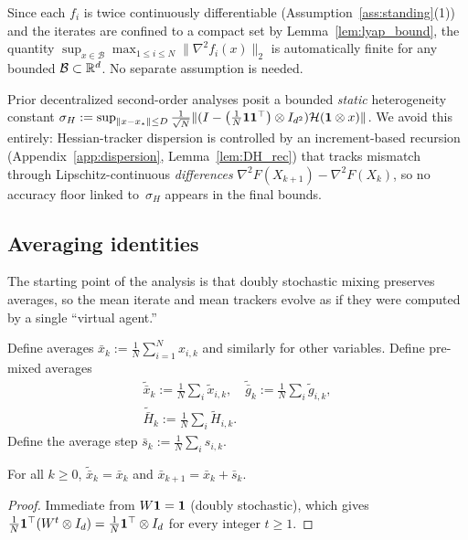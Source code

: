 \documentclass[review,onefignum,onetabnum]{siamart171218}
\begin{document}
	\begin{remark}
		Since each $f_i$ is twice continuously differentiable (Assumption~\ref{ass:standing}(1))
		and the iterates are confined to a compact set by Lemma~\ref{lem:lyap_bound},
		the quantity $\sup_{x\in\mathcal B}\max_{1\le i\le N}\|\nabla^2 f_i(x)\|_2$
		is automatically finite for any bounded $\mathcal B\subset\mathbb{R}^d$.
		No separate assumption is needed.
	\end{remark}

	\begin{remark}
		Prior decentralized second-order analyses
		\citep{mokhtari2016esom,sun2022sonata,ye2023networkgiant} posit a bounded
		\emph{static} heterogeneity constant
		$\sigma_H:=\sup_{\|x-x_\star\|\le D}
		  \frac{1}{\sqrt N}\|(I-\left(\frac{1}{N}\mathbf{1}\mathbf{1}^\top\right)\otimes I_{d^2})\mathcal H(\mathbf{1}\otimes x)\|$.
		We avoid this entirely: Hessian-tracker dispersion is controlled
		by an increment-based recursion
		(Appendix~\ref{app:dispersion}, Lemma~\ref{lem:DH_rec})
		that tracks mismatch through Lipschitz-continuous
		\emph{differences} $\nabla^2 F(X_{k+1})-\nabla^2 F(X_k)$,
		so no accuracy floor linked to~$\sigma_H$ appears in the
		final bounds.
	\end{remark}

\subsection{Averaging identities}\label{ssec:avg}
The starting point of the analysis is that doubly stochastic mixing
preserves averages, so the mean iterate and mean trackers evolve as if
they were computed by a single ``virtual agent.''

Define averages $\bar x_k:=\frac1N\sum_{i=1}^N x_{i,k}$ and similarly for other variables.
Define pre-mixed averages
\begin{gather*}
\tilde{\bar x}_k:=\tfrac1N\!\sum_i \tilde x_{i,k},\quad
\tilde{\bar g}_k:=\tfrac1N\!\sum_i \tilde g_{i,k},\\
\tilde{\bar H}_k:=\tfrac1N\!\sum_i \tilde H_{i,k}.
\end{gather*}
Define the average step $\bar s_k:=\frac1N\sum_i s_{i,k}$.

\begin{lemma}\label{lem:avg-pres}
For all $k\ge0$, $\tilde{\bar x}_k=\bar x_k$ and $\bar x_{k+1}=\bar x_k+\bar s_k$.
\end{lemma}
\begin{proof}
Immediate from $W\mathbf{1}=\mathbf{1}$ (doubly stochastic),
which gives $\frac1N\mathbf{1}^\top(W^t\otimes I_d)=\frac1N\mathbf{1}^\top\otimes I_d$
for every integer $t\ge 1$.
\end{proof}
\end{document}
